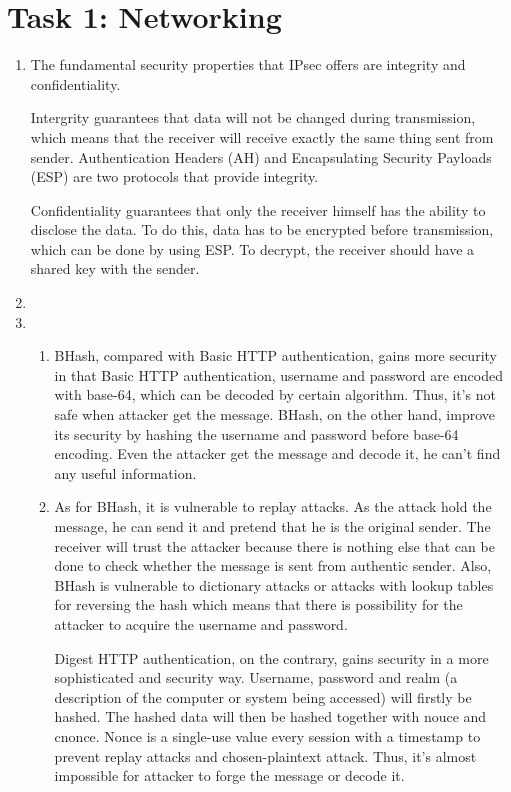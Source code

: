 \section*{Task 1: Networking}
\begin{enumerate}
\item %
  The fundamental security properties that IPsec offers are integrity and confidentiality.
   \par Intergrity guarantees that data will not be changed during transmission, which means that the receiver will receive exactly the same thing sent from sender. Authentication Headers (AH) and Encapsulating Security Payloads (ESP) are two protocols that provide integrity.\cite{wikipedia_IPSec}
   \par Confidentiality guarantees that only the receiver himself has the ability to disclose the data. To do this, data has to be encrypted before transmission, which can be done by using ESP. To decrypt, the receiver should have a shared key with the sender.
  \item \highergradesonly
  \item %
    \begin{enumerate}
    \item
      BHash, compared with Basic HTTP authentication, gains more security in that Basic HTTP authentication, username and password are encoded with base-64\cite{wikipedia_BasicHTTP}, which can be decoded by certain algorithm. Thus, it's not safe when attacker get the message. BHash, on the other hand, improve its security by hashing the username and password before base-64 encoding. Even the attacker get the message and decode it, he can't find any useful information.  
    \item
    As for BHash, it is vulnerable to replay attacks. As the attack hold the message, he can send it and pretend that he is the original sender. The receiver will trust the attacker because there is nothing else that can be done to check whether the message is sent from authentic sender.
    Also, BHash is vulnerable to dictionary attacks or attacks with lookup tables for reversing the hash which means that there is possibility for the attacker to acquire the username and password.
   \par Digest HTTP authentication, on the contrary, gains security in a more sophisticated and security way. Username, password and realm (a description of the computer or system being accessed) will firstly be hashed. The hashed data will then be hashed together with nouce and cnonce. Nonce is a single-use value every session with a timestamp to prevent replay attacks and chosen-plaintext attack.\cite{wikipedia_DigestHTTP} Thus, it's almost impossible for attacker to forge the message or decode it.
    \end{enumerate}
\end{enumerate}
